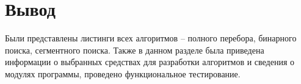 \section{Вывод}

Были представлены листинги всех алгоритмов -- полного перебора, бинарного поиска, сегментного поиска. Также в данном разделе была приведена информации о выбранных средствах для разработки алгоритмов и сведения о модулях программы, проведено функциональное тестирование.
